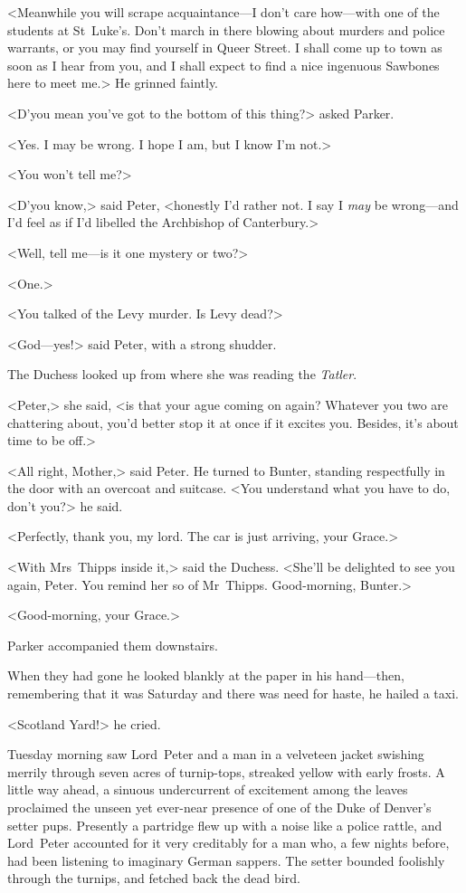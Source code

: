 <Meanwhile you will scrape acquaintance—I don't care how—with one of the students at St~Luke's. Don't march in there blowing about murders and police warrants, or you may find yourself in Queer Street. I shall come up to town as soon as I hear from you, and I shall expect to find a nice ingenuous Sawbones here to meet me.> He grinned faintly.

<D'you mean you've got to the bottom of this thing?> asked Parker.

<Yes. I may be wrong. I hope I am, but I know I'm not.>

<You won't tell me?>

<D'you know,> said Peter, <honestly I'd rather not. I say I \textit{may} be wrong—and I'd feel as if I'd libelled the Archbishop of Canterbury.>

<Well, tell me—is it one mystery or two?>

<One.>

<You talked of the Levy murder. Is Levy dead?>

<God—yes!> said Peter, with a strong shudder.

The Duchess looked up from where she was reading the \textit{Tatler}.

<Peter,> she said, <is that your ague coming on again? Whatever you two are chattering about, you'd better stop it at once if it excites you. Besides, it's about time to be off.>

<All right, Mother,> said Peter. He turned to Bunter, standing respectfully in the door with an overcoat and suitcase. <You understand what you have to do, don't you?> he said.

<Perfectly, thank you, my lord. The car is just arriving, your Grace.>

<With Mrs~Thipps inside it,> said the Duchess. <She'll be delighted to see you again, Peter. You remind her so of Mr~Thipps. Good-morning, Bunter.>

<Good-morning, your Grace.>

Parker accompanied them downstairs.

When they had gone he looked blankly at the paper in his hand—then, remembering that it was Saturday and there was need for haste, he hailed a taxi.

<Scotland Yard!> he cried.

Tuesday morning saw Lord~Peter and a man in a velveteen jacket swishing merrily through seven acres of turnip-tops, streaked yellow with early frosts. A little way ahead, a sinuous undercurrent of excitement among the leaves proclaimed the unseen yet ever-near presence of one of the Duke of Denver's setter pups. Presently a partridge flew up with a noise like a police rattle, and Lord~Peter accounted for it very creditably for a man who, a few nights before, had been listening to imaginary German sappers. The setter bounded foolishly through the turnips, and fetched back the dead bird.

